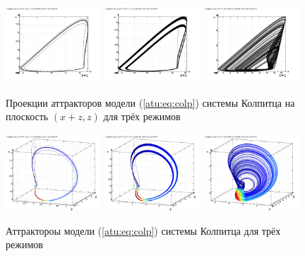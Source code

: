 \documentclass[a4paper,12pt]{article}
\begin{document}
\begin{figure}[htb!]
 \centerline{
   \includegraphics[width=0.32\textwidth]{p/cha/colp/colp_0-p_z_xpz_b=1x70.png}
   \includegraphics[width=0.32\textwidth]{p/cha/colp/colp_0-p_z_xpz_b=1x37.png}
   \includegraphics[width=0.32\textwidth]{p/cha/colp/colp_0-p_z_xpz_b=0x99.png}
 }
  \caption{Проекции аттракторов модели (\ref{atu:eq:colp}) системы Колпитца на плоскость $(x+z,z)$
  для трёх режимов}
  \label{atu:f:colp_model_xzz}
\end{figure}


\begin{figure}[htb!]
 \centerline{
   \includegraphics[width=0.32\textwidth]{p/cha/colp/colp_0-p_xyz_b=1x70.png}
   \includegraphics[width=0.32\textwidth]{p/cha/colp/colp_0-p_xyz_b=1x37.png}
   \includegraphics[width=0.32\textwidth]{p/cha/colp/colp_0-p_xyz_b=0x99.png}
 }
  \caption{Аттрактороы модели (\ref{atu:eq:colp}) системы Колпитца для трёх режимов}
  \label{atu:f:colp_model_xyz}
\end{figure}
\end{document}

